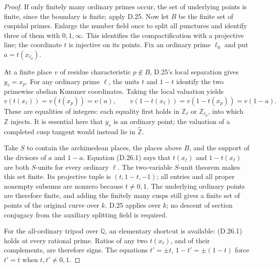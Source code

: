 \begin{proof}
If only finitely many ordinary primes
occur, the set of underlying points is
finite, since the boundary is finite;
apply D.25. Now let \(B\) be the finite
set of cuspidal primes. Enlarge the
number field once to split all punctures
and identify three of them with
\(0,1,\infty\). This identifies the
compactification with a projective line;
the coordinate \(t\) is injective on
its points. Fix an ordinary prime
\(\ell_0\) and put \(a=t(x_{\ell_0})\).

At a finite place \(v\) of residue
characteristic \(p\notin B\), D.25's
local separation gives \(y_v=x_p\).
For any ordinary prime \(\ell\), the
units \(t\) and \(1-t\) identify the
two primewise abelian Kummer coordinates.
Taking the local valuation yields
\[
 v(t(x_\ell))=v(t(x_p))=v(a),\qquad
 v(1-t(x_\ell))=v(1-t(x_p))=v(1-a).              \tag{D.26.1}
\]
These are equalities of integers: each
equality first holds in \(\mathbb Z_\ell\)
or \(\mathbb Z_{\ell_0}\), into which
\(\mathbb Z\) injects. It is essential
here that \(y_v\) is an ordinary point;
the valuation of a completed cusp tangent
would instead lie in \(\widehat{\mathbb Z}\).

Take \(S\) to contain the archimedean
places, the places above \(B\), and the
support of the divisors of \(a\) and
\(1-a\). Equation (D.26.1) says that
\(t(x_\ell)\) and \(1-t(x_\ell)\)
are both \(S\)-units for every ordinary
\(\ell\). The two-variable \(S\)-unit
theorem \cite[Theorem 1, with \(n=2,c=1,d=0\)]{DE_Evertse1984}
makes this set finite. Its projective
tuple is \((t,1-t,-1)\); all entries
and all proper nonempty subsums are
nonzero because \(t\ne0,1\).
The underlying ordinary points are
therefore finite, and adding the finitely
many cusps still gives a finite set of
points of the original curve over \(k\).
D.25 applies over \(k\); no descent of
section conjugacy from the auxiliary
splitting field is required.

For the all-ordinary tripod over
\(\mathbb Q\), an elementary shortcut
is available: (D.26.1) holds at every
rational prime. Ratios of any two
\(t(x_\ell)\), and of their complements,
are therefore signs. The equations
\(t'=\pm t\), \(1-t'=\pm(1-t)\)
force \(t'=t\) when \(t,t'\ne0,1\).
\end{proof}

